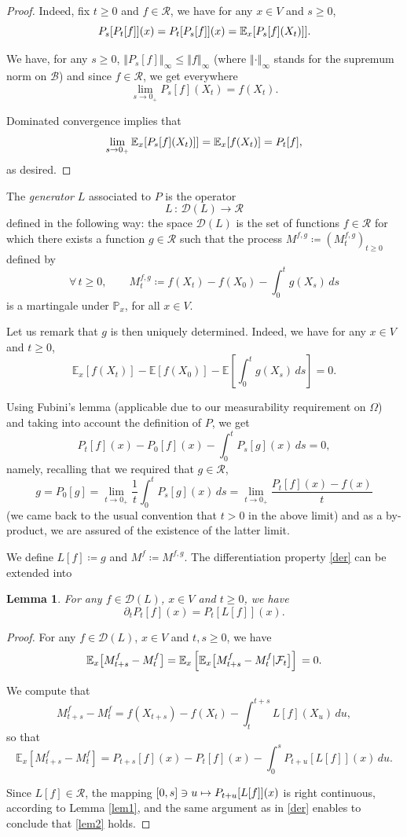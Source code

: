 \documentclass[10pt]{amsart}
\newcommand\mto{\mathchoice{\longmapsto}{\mapsto}{\mapsto}{\mapsto}}
\theoremstyle{plain}
\newtheorem{lemma}[thm]{Lemma}
\theoremstyle{definition}
\newcommand{\EE}{{\mathbb E}}
\newcommand{\PP}{{\mathbb P}}
\newcommand\df{\coloneqq}
\newcommand{\bq}{\begin{equation*}}
\newcommand{\bqn}[1]{\begin{equation}\label{#1}}
\newcommand{\eq}{\end{equation*}}
\newcommand{\eqn}{\end{equation}}
\newcommand{\fo}{\forall\,}
\newcommand{\lVe}{\lt\Vert}
\newcommand{\rVe}{\rt\Vert}
\newcommand{\lt}{\left}
\newcommand{\rt}{\right}
\newcommand{\st}{\,:\,}
\let\pa\partial
\let\iy\infty
\newcommand{\cB}{\mathcal{B}}
\newcommand{\cD}{\mathcal{D}}
\newcommand{\cF}{\mathcal{F}}
\newcommand{\cR}{\mathcal{R}}
\begin{document}
\begin{proof}
Indeed, fix $t\geq 0$ and $f\in\cR$, we have for any $x\in V$ and $s\geq 0$,
\bq
P_s[P_t[f]](x)=P_t[P_s[f]](x)\\
=\EE_x[ P_s[f](X_t)]].\eq
\par
We have, for any $s\geq 0$,
$\lVe P_s[f]\rVe_{\iy}\leq \lVe f\rVe_{\iy}$ (where $\lVe \cdot\rVe_{\iy}$ stands for the supremum norm on $\cB$)
and since $f\in\cR$, we get
everywhere
\bq
\lim_{s\to 0_+} P_s[f](X_t)=f(X_t).\eq
\par
Dominated convergence implies that
\bq
\lim_{s\to 0_+} \EE_x[ P_s[f](X_t)]]=\EE_x[f(X_t)]\\
=P_t[f],
\eq
as desired.\end{proof}

The \emph{generator} $L$ associated to $P$ is the operator
\bq
L\st \cD(L)\to \cR\eq
defined in the following way:
the space $\cD(L)$ is the set of functions $f\in\cR$
for which there exists a function $g\in\cR$ such that
the process $M^{f,g}\df(M^{f,g}_t)_{t\geq 0}$ defined by
\bq
\fo t\geq 0,\qquad M^{f,g}_t\df f(X_t)-f(X_0)-\int_0^t g(X_s)\, ds\eq
is a martingale under $\PP_x$, for all $x\in V$.
\par
Let us remark that $g$ is then uniquely determined. Indeed, we have for any $x\in V$ and $t\geq 0$,
\bq
\EE_x[f(X_t)]-\EE[f(X_0)]-\EE\lt[\int_0^t g(X_s)\, ds\rt]=0.\eq
\par
Using Fubini's lemma (applicable due to our measurability requirement on $\Omega$) and taking into account the definition of $P$, we get
\bq
P_t[f](x)-P_0[f](x)-\int_0^tP_s[g](x)\,ds=0,
\eq
namely, recalling that we required that $g\in\cR$,
\bqn{der}
g=P_0[g] =\lim_{t\to 0_+} \frac1t \int_0^tP_s[g](x)\,ds=\lim_{t\to 0_+} \frac{P_t[f](x)-f(x)}{t}\eqn
(we came back to the usual convention that $t>0$ in the above limit) and as a by-product, we are assured of the existence of the latter limit.
\par
We define $L[f]\df g$ and $M^f\df M^{f,g}$.
The differentiation property \eqref{der} can be extended into
\begin{lemma}
For any $f\in\cD(L)$, $x\in V$ and $t\geq 0$, we have
\bqn{lem2}
\pa_t P_t[f](x)=P_t[L[f]](x).
\eqn
\end{lemma}
\begin{proof}
For any $f\in\cD(L)$, $x\in V$ and $t,s\geq 0$, we have
\bq
\EE_x\bigl[ M_{t+s}^f-M_t^f\bigr]=\EE_x\lt[\EE_x\bigl[ M_{t+s}^f-M_t^f\vert\cF_t\bigl]\rt]\\
=0.\eq
\par
We compute that
\bq
M_{t+s}^f-M_t^f=f(X_{t+s})-f(X_t)-\int_t^{t+s} L[f](X_u)\, du,
\eq
so that
\bq
\EE_x\lt[ M_{t+s}^f-M_t^f\rt]=
P_{t+s}[f](x)-P_t[f](x)-\int_0^sP_{t+u}[L[f]](x)\, du.\eq\par
Since $L[f]\in\cR$, the mapping $[0,s]\ni u\mto P_{t+u}[L[f]](x)$ is right continuous, accord\-ing to Lemma \ref{lem1},
and the same argument as in \eqref{der} enables to conclude that \eqref{lem2} holds.\end{proof}
\end{document}
